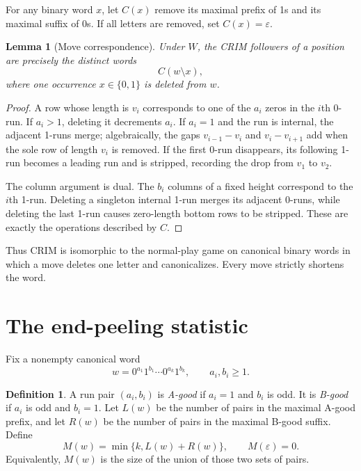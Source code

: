 \documentclass[11pt]{amsart}
\newtheorem{lemma}[theorem]{Lemma}
\theoremstyle{definition}
\newtheorem{definition}[theorem]{Definition}
\newcommand{\eps}{\varepsilon}
\begin{document}
For any binary word $x$, let $C(x)$ remove its maximal prefix of 1s and its
maximal suffix of 0s.  If all letters are removed, set $C(x)=\eps$.

\begin{lemma}[Move correspondence]\label{lem:moves}
Under $W$, the CRIM followers of a position are precisely the distinct words
\[
 C(w\setminus x),
\]
where one occurrence $x\in\{0,1\}$ is deleted from $w$.
\end{lemma}

\begin{proof}
A row whose length is $v_i$ corresponds to one of the $a_i$ zeros in the
$i$th 0-run.  If $a_i>1$, deleting it decrements $a_i$.  If $a_i=1$ and the
run is internal, the adjacent 1-runs merge; algebraically, the gaps
$v_{i-1}-v_i$ and $v_i-v_{i+1}$ add when the sole row of length $v_i$ is
removed.  If the first 0-run disappears, its following 1-run becomes a
leading run and is stripped, recording the drop from $v_1$ to $v_2$.

The column argument is dual.  The $b_i$ columns of a fixed height correspond
to the $i$th 1-run.  Deleting a singleton internal 1-run merges its adjacent
0-runs, while deleting the last 1-run causes zero-length bottom rows to be
stripped.  These are exactly the operations described by $C$.
\end{proof}

Thus CRIM is isomorphic to the normal-play game on canonical binary words in
which a move deletes one letter and canonicalizes.  Every move strictly
shortens the word.

\section{The end-peeling statistic}

Fix a nonempty canonical word
\begin{equation}\label{eq:runs}
 w=0^{a_1}1^{b_1}\cdots0^{a_k}1^{b_k},
 \qquad a_i,b_i\ge1.
\end{equation}

\begin{definition}\label{def:M}
A run pair $(a_i,b_i)$ is \emph{A-good} if $a_i=1$ and $b_i$ is odd.  It is
\emph{B-good} if $a_i$ is odd and $b_i=1$.  Let $L(w)$ be the number of
pairs in the maximal A-good prefix, and let $R(w)$ be the number of pairs in
the maximal B-good suffix.  Define
\[
 M(w)=\min\{k,L(w)+R(w)\},
 \qquad M(\eps)=0.
\]
Equivalently, $M(w)$ is the size of the union of those two sets of pairs.
\end{definition}
\end{document}

